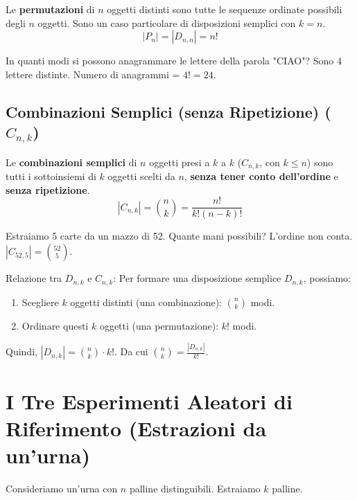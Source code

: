 \begin{definition}[Permutazioni ($P_n$)]
Le \textbf{permutazioni} di $n$ oggetti distinti sono tutte le sequenze ordinate possibili degli $n$ oggetti. Sono un caso particolare di disposizioni semplici con $k=n$.
$$ |P_n| = |D_{n,n}| = n! $$
\end{definition}
\begin{example}
In quanti modi si possono anagrammare le lettere della parola "CIAO"?
Sono 4 lettere distinte. Numero di anagrammi = $4! = 24$.
\end{example}

\subsection{Combinazioni Semplici (senza Ripetizione) ($C_{n,k}$)}
\begin{definition}
Le \textbf{combinazioni semplici} di $n$ oggetti presi a $k$ a $k$ ($C_{n,k}$, con $k \le n$) sono tutti i sottoinsiemi di $k$ oggetti scelti da $n$, \textbf{senza tener conto dell'ordine} e \textbf{senza ripetizione}.
$$ |C_{n,k}| = \binom{n}{k} = \frac{n!}{k!(n-k)!} $$
\end{definition}
\begin{example}
Estraiamo 5 carte da un mazzo di 52. Quante mani possibili? L'ordine non conta.
$|C_{52,5}| = \binom{52}{5}$.
\end{example}
\begin{remark}
Relazione tra $D_{n,k}$ e $C_{n,k}$:
Per formare una disposizione semplice $D_{n,k}$, possiamo:
\begin{enumerate}
    \item Scegliere $k$ oggetti distinti (una combinazione): $\binom{n}{k}$ modi.
    \item Ordinare questi $k$ oggetti (una permutazione): $k!$ modi.
\end{enumerate}
Quindi, $|D_{n,k}| = \binom{n}{k} \cdot k!$. Da cui $\binom{n}{k} = \frac{|D_{n,k}|}{k!}$.
\end{remark}

\section{I Tre Esperimenti Aleatori di Riferimento (Estrazioni da un'urna)}
Consideriamo un'urna con $n$ palline distinguibili. Estraiamo $k$ palline.

